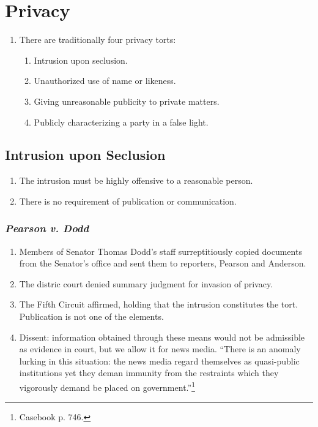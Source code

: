 \section{Privacy}

\begin{enumerate}
    \item There are traditionally four privacy torts:
    \begin{enumerate}
        \item Intrusion upon seclusion.
        \item Unauthorized use of name or likeness.
        \item Giving unreasonable publicity to private matters.
        \item Publicly characterizing a party in a false light.
    \end{enumerate}
\end{enumerate}

\subsection{Intrusion upon Seclusion}

\begin{enumerate}
    \item The intrusion must be highly offensive to a reasonable person.
    \item There is no requirement of publication or communication.
\end{enumerate}

\subsubsection{\emph{Pearson v. Dodd}}

\begin{enumerate}
    \item Members of Senator Thomas Dodd's staff surreptitiously copied 
    documents from the Senator's office and sent them to reporters, Pearson 
    and Anderson.
    \item The distric court denied summary judgment for invasion of privacy.
    \item The Fifth Circuit affirmed, holding that the intrusion constitutes
    the tort. Publication is not one of the elements.
    \item Dissent: information obtained through these means would not be 
    admissible as evidence in court, but we allow it for news media. ``There 
    is an anomaly lurking in this situation: the news media regard themselves 
    as quasi-public institutions yet they deman immunity from the restraints 
    which they vigorously demand be placed on government.''\footnote{Casebook 
    p. 746.}
\end{enumerate}

